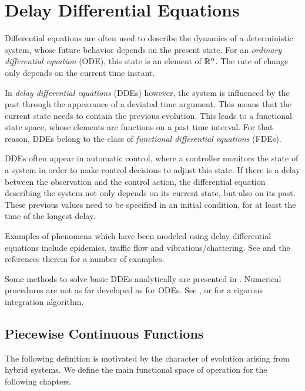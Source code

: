 \chapter{Delay Differential Equations}

Differential equations are often used to describe the dynamics of a deterministic system, whose future behavior depends on the present state.
For an \emph{ordinary differential equation} (ODE), this state is an element of $\mathbb{R}^n$. The rate of change only depends on the current time instant.

In \emph{delay differential equations} (DDEs) however, the system is influenced by the past through the appearance of a deviated time argument. This means that the current state needs to contain the previous evolution.
This leads to a functional state space, whose elements are functions on a past time interval.
For that reason, DDEs belong to the class of \emph{functional differential equations} (FDEs).

DDEs often appear in automatic control, where a controller monitors the state of a system in order to make control decisions to adjust this state.
If there is a delay between the observation and the control action, the differential equation describing the system not only depends on its current state, but also on its past.
These previous values need to be specified in an initial condition, for at least the time of the longest delay.


Examples of phenomena which have been modeled using delay differential equations include epidemics, traffic flow and vibrations/chattering. See \cite{Falbo06FDEs} and the references therein for a number of examples.

Some methods to solve basic DDEs analytically are presented in \cite{Falbo06FDEs}. Numerical procedures are not as far developed as for ODEs. 
See \cite{Bellen13NumericalDDEs}, or \cite{Szczlina14RigorousDDEs} for a rigorous integration algorithm.

\section{Piecewise Continuous Functions}
    \label{sec:piecewise-continuous-functions}
    
    The following definition is motivated by the character of evolution arising from hybrid systems. We define the main functional space of operation for the following chapters.

